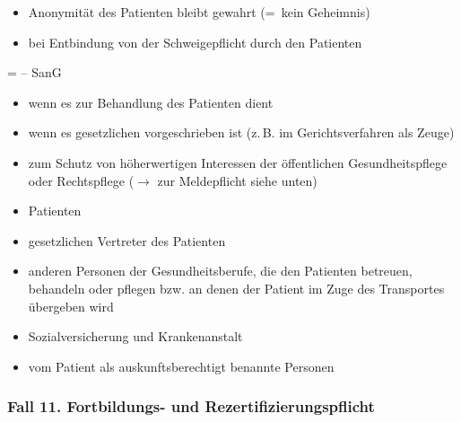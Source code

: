 
\begin{itemize}
    \item Anonymität des Patienten bleibt gewahrt (=~kein
    Geheimnis)
    \item bei Entbindung von der Schweigepflicht durch den Patienten
\end{itemize}

 =   --
 SanG

\begin{itemize}
    \item 
    wenn es zur Behandlung des Patienten dient
    \item 
    wenn es gesetzlichen vorgeschrieben ist (z.\,B. im
    Gerichtsverfahren als Zeuge)
    \item zum Schutz von höherwertigen Interessen der öffentlichen
    Gesundheitspflege oder Rechtspflege (${\rightarrow}$ zur Meldepflicht
    siehe unten)
\end{itemize}


\begin{itemize}
    \item 
    Patienten
    \item 
    gesetzlichen Vertreter des Patienten
    \item 
    anderen Personen der Gesundheitsberufe, die den
    Patienten	betreuen, behandeln oder pflegen bzw. an denen der Patient im Zuge des Transportes übergeben wird
       \item Sozialversicherung und Krankenanstalt
       \item vom Patient als auskunftsberechtigt benannte Personen
\end{itemize}




\subsubsection{Fall 11. Fortbildungs- und Rezertifizierungspflicht}
\label{jus-fall:fortbildung}


